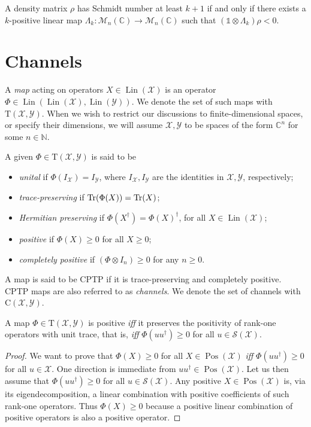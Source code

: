 \documentclass[12pt]{report}
\newcommand{\CC}{\mathbb{C}}
\newcommand{\NN}{\mathbb{N}}
\newcommand{\calY}{{\mathcal{Y}}}
\newcommand{\calS}{{\mathcal{S}}}
\newcommand{\calX}{{\mathcal{X}}}
\newcommand{\rmC}{{\mathrm{C}}}
\newcommand{\rmD}{{\mathrm{D}}}
\newcommand{\rmT}{{\mathrm{T}}}
\DeclareMathOperator{\Pos}{Pos}
\DeclareMathOperator{\Lin}{Lin}
\begin{document}
\begin{thm}
	A density matrix $\rho$ has Schmidt number at least $k+1$ if and only if there exists a $k$-positive linear map $\Lambda_k: \mathcal M_n(\mathbb C)\rightarrow \mathcal M_n(\mathbb C)$ such that 
	$(\mathds1\otimes \Lambda_k)\rho < 0$.
\end{thm}

\chapter{Channels}
\minitoc

A \emph{map} acting on operators $X\in\Lin(\calX)$ is an operator $\Phi\in\Lin(\Lin(\calX),\Lin(\calY))$. We denote the set of such maps with $\rmT(\calX,\calY)$.
When we wish to restrict our discussions to finite-dimensional spaces, or specify their dimensions, we will assume $\calX,\calY$ to be spaces of the form $\CC^n$ for some $n\in\NN$.

A given $\Phi\in\rmT(\calX,\calY)$ is said to be
\begin{itemize}
	\item \emph{unital} if $\Phi(I_{\calX})=I_{\calY}$, where $I_{\calX},I_{\calY}$ are the identities in $\calX,\calY$, respectively;
	\item \emph{trace-preserving} if $\Tr(\Phi(X))=\Tr(X)$;
	\item \emph{Hermitian preserving} if $\Phi(X^\dagger)=\Phi(X)^\dagger$, for all $X\in\Lin(\calX)$;
	\item \emph{positive} if $\Phi(X)\ge0$ for all $X\ge0$;
	\item \emph{completely positive} if $(\Phi\otimes I_n)\ge0$ for any $n\ge0$.
\end{itemize}

A map is said to be CPTP if it is trace-preserving and completely positive. CPTP maps are also referred to as \emph{channels}. We denote the set of channels with $\rmC(\calX,\calY)$.


\begin{prop}\label{prop:characterisation_of_positive_maps_from_rank1ops}
	A map $\Phi\in\rmT(\calX,\calY)$ is positive \emph{iff} it preserves the positivity of rank-one operators with unit trace, that is, \emph{iff} $\Phi(uu^\dagger)\ge0$ for all $u\in\calS(\calX)$.
\end{prop}
\begin{proof}
	We want to prove that $\Phi(X)\ge0$ for all $X\in\Pos(\calX)$ \emph{iff} $\Phi(uu^\dagger)\ge0$ for all $u\in\calX$.
	One direction is immediate from $uu^\dagger\in\Pos(\calX)$.
	Let us then assume that $\Phi(uu^\dagger)\ge0$ for all $u\in\calS(\calX)$.
	Any positive $X\in\Pos(\calX)$ is, via its eigendecomposition, a linear combination with positive coefficients of such rank-one operators.
	Thus $\Phi(X)\ge0$ because a positive linear combination of positive operators is also a positive operator.
\end{proof}
\end{document}
